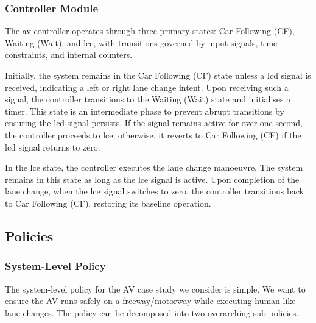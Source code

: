 \subsubsection{Controller Module}
\label{sec:controller_module}

The  \gls{av} controller operates through three primary states: Car Following (CF), Waiting (Wait), and \gls{lce}, with transitions governed by input signals, time constraints, and internal counters.

Initially, the system remains in the Car Following (CF) state unless a \gls{lcd} signal is received, indicating a left or right lane change intent. Upon receiving such a signal, the controller transitions to the Waiting (Wait) state and initialises a timer. This state is an intermediate phase to prevent abrupt transitions by ensuring the \gls{lcd} signal persists. If the signal remains active for over one second, the controller proceeds to \gls{lce}; otherwise, it reverts to Car Following (CF) if the \gls{lcd} signal returns to zero.

In the \gls{lce} state, the controller executes the lane change manoeuvre. The system remains in this state as long as the \gls{lce} signal is active. Upon completion of the lane change, when the \gls{lce} signal switches to zero, the controller transitions back to Car Following (CF), restoring its baseline operation.



\subsection{Policies}
\label{sec:policies}

\subsubsection{System-Level Policy}
\label{sec:system_level_policy}

The system-level policy for the AV case study we consider is simple. We want to ensure the AV runs safely on a freeway/motorway while executing human-like lane changes. The policy can be decomposed into two overarching sub-policies. 

